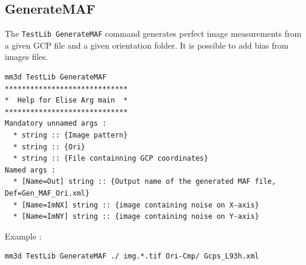 \subsection{GenerateMAF}
The {\tt TestLib GenerateMAF} command generates perfect image measurements from a given GCP file and a given orientation folder. It is possible to add bias from images files.

\begin{verbatim}
mm3d TestLib GenerateMAF
*****************************
*  Help for Elise Arg main  *
*****************************
Mandatory unnamed args : 
  * string :: {Image pattern}
  * string :: {Ori}
  * string :: {File containning GCP coordinates}
Named args : 
  * [Name=Out] string :: {Output name of the generated MAF file, Def=Gen_MAF_Ori.xml}
  * [Name=ImNX] string :: {image containing noise on X-axis}
  * [Name=ImNY] string :: {image containing noise on Y-axis}
\end{verbatim}

Example :
\begin{verbatim}
mm3d TestLib GenerateMAF ./ img.*.tif Ori-Cmp/ Gcps_L93h.xml
\end{verbatim}


